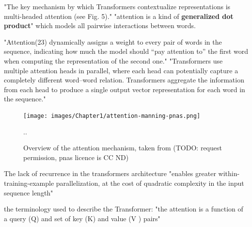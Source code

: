 "The key mechanism by which Transformers contextualize representations  is  multi-headed  attention  (see  Fig.  5)."  \citep{manning2020emergent} 
"attention is a kind of \textbf{generalized dot product}" %
which models all pairwise interactions between words.

"Attention(23) dynamically assigns a weight to every pair of words in the sequence, indicating how much the model should “pay attention to” the first word when computing the representation of the second one."  \citep{manning2020emergent}
"Transformers use multiple attention heads in parallel, where  each  head  can  potentially  capture  a  completely  different word–word relation. Transformers aggregate the information from each head to produce a single output vector representation for each word in the sequence." \citep{manning2020emergent}

\begin{figure}[H]
	\centering
	\texttt{[image: images/Chapter1/attention-manning-pnas.png]} 
	\caption{Overview of the attention mechanism, taken from \citet{manning2020emergent} (TODO: request permission, pnas licence is CC ND)} 
	\label{fig:manning_attention} 
	\medskip
	\small
	..
\end{figure}

The lack of recurrence in the transformers architecture "enables greater within-training-example parallelization, at the cost of quadratic complexity in the input sequence length" \citep{liu2018generating} 


the terminology used to describe the Transformer: "the attention is a function of a query (Q) and set of key (K) and value (V ) pairs" \citep{liu2018generating} 






